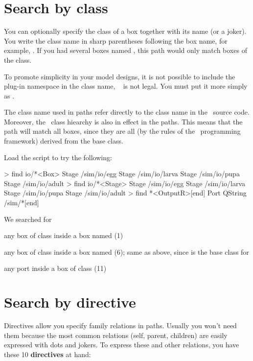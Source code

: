 \section{Search by class}
You can optionally specify the class of a box together with its name (or a joker). You write the class name in sharp parentheses following the box name, for example, . If you had several boxes named , this path would only match boxes of the  class. 

To promote simplicity in your model designs, it is not possible to include the plug-in namespace in the class name, \eg\  is not legal. You must put it more simply as .

The class name used in paths refer directly to the class name in the \CPP\ source code. Moreover, the \CPP\ class hiearchy is also in effect in the paths. This means that the path  will match all boxes, since they are all (by the rules of the \US\ programming framework) derived from the  base class. 

Load the  script to try the following:

\lstset{numbers=left}
\begin{usdialog}
> find io/*<Box>
Stage /sim/io/egg
Stage /sim/io/larva
Stage /sim/io/pupa
Stage /sim/io/adult
> find io/*<Stage>
Stage /sim/io/egg
Stage /sim/io/larva
Stage /sim/io/pupa
Stage /sim/io/adult
> find *<OutputR>[end]
Port QString /sim/*[end]
\end{usdialog}
\lstset{numbers=none}

\noindent
We searched for 
\begin{compactitem}
\item any box of class  inside a box named  (1)
\item any box of class  inside a box named  (6); same as above, since  is the base class for 
\item any  port inside a box of class  (11)
\end{compactitem}

\section{Search by directive}
Directives allow you specify family relations in paths. Usually you won't need them because the most common relations (self, parent, children) are easily expressed with dots and jokers. To express these and other relations, you have these 10 \textbf{directives} at hand:

